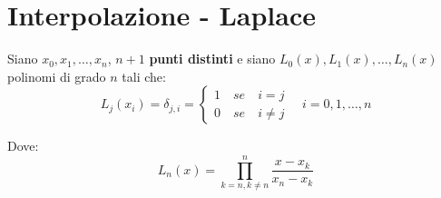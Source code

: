 \chapter{Interpolazione - Laplace}

Siano $x_0, x_1, \dots, x_n$, $n + 1$ \textbf{punti distinti} e siano $L_0(x), L_1(x), \dots, L_n(x)$ polinomi di grado $n$ tali che:
\begin{equation}
 L_j(x_i) = \delta_{j, i} = 
   \begin{cases}
      1 \quad se \quad i = j \\ 
      0 \quad se \quad i \neq j
   \end{cases}
   \quad 
   i = 0,1, \dots, n
\end{equation}

Dove:
\begin{equation}
  L_n(x) = \prod_{k=n,k\neq n}^{n} \displaystyle\frac{x - x_k}{x_n - x_k}
\end{equation}


